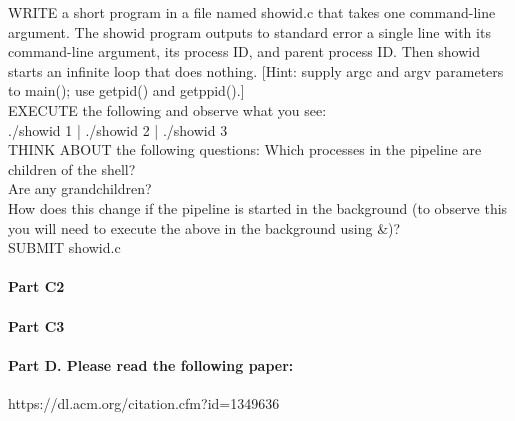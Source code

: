 \documentclass[11pt]{article}
\begin{document}
WRITE a short program in a file named showid.c that takes one command-line argument. The showid program outputs to standard error a single line with its command-line argument, its process ID, and parent process ID. Then showid starts an infinite loop that does nothing. [Hint: supply argc and argv parameters to main(); use getpid() and getppid().]\\

EXECUTE the following and observe what you see:\\
./showid 1 | ./showid 2 | ./showid 3\\

THINK ABOUT the following questions: Which processes in the pipeline are children of the shell? \\
Are any grandchildren?\\

How does this change if the pipeline is started in the background (to observe this you will need to execute the above in the background using \&)?\\

SUBMIT showid.c\\
\paragraph{Part C2}
\paragraph{Part C3}
\paragraph{Part D. Please read the following paper:}

https://dl.acm.org/citation.cfm?id=1349636
\end{document}
